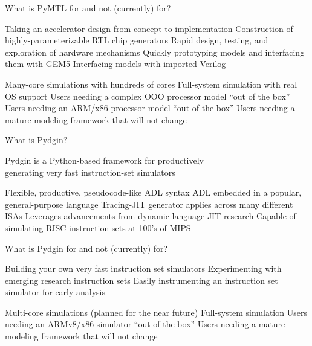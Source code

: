 \begin{frame}{What is PyMTL for and not (currently) for?}
\begin{cbxlist}

  \1 

     \2 Taking an accelerator design from concept to implementation
     \2 Construction of highly-parameterizable RTL chip generators
     \2 Rapid design, testing, and exploration of hardware mechanisms
     \2 Quickly prototyping models and interfacing them with GEM5
     \2 Interfacing models with imported Verilog

  \1 

     \2 Many-core simulations with hundreds of cores
     \2 Full-system simulation with real OS support
     \2 Users needing a complex OOO processor model ``out of the box''
     \2 Users needing an ARM/x86 processor model ``out of the box''
     \2 Users needing a mature modeling framework that will not change

\end{cbxlist}
\end{frame}

\begin{frame}{What is Pydgin?}

  \begin{center}
    Pydgin is a Python-based framework for productively \\ generating
    very fast instruction-set simulators
  \end{center}


  \medskip\centering
  \begin{cbxlist}[t]

    \1 Flexible, productive, pseudocode-like ADL syntax
    \1 ADL embedded in a popular, general-purpose language
    \1 Tracing-JIT generator applies across many different ISAs
    \1 Leverages advancements from dynamic-language JIT research
    \1 Capable of simulating RISC instruction sets at 100's of MIPS

  \end{cbxlist}

\end{frame}

\begin{frame}{What is Pydgin for and not (currently) for?}
\begin{cbxlist}

  \1 

     \2 Building your own very fast instruction set simulators
     \2 Experimenting with emerging research instruction sets
     \2 Easily instrumenting an instruction set simulator for early analysis

  \1 

     \2 Multi-core simulations (planned for the near future)
     \2 Full-system simulation
     \2 Users needing  an ARMv8/x86 simulator ``out of the box''
     \2 Users needing a mature modeling framework that will not change

\end{cbxlist}
\end{frame}

